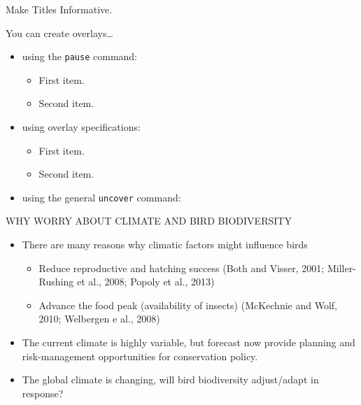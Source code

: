 \documentclass{beamer}
\begin{document}
\begin{frame}
\begin{figure}[h]
\centering
\end{figure}
\end{frame}

\begin{frame}
\begin{figure}[h]
\centering
\end{figure}
\end{frame}

\begin{frame}{Make Titles Informative.}

  You can create overlays\dots
  \begin{itemize}
  \item using the \texttt{pause} command:
    \begin{itemize}
    \item
      First item.
      \pause
    \item
      Second item.
    \end{itemize}
  \item
    using overlay specifications:
    \begin{itemize}
    \item<3->
      First item.
    \item<4->
      Second item.
    \end{itemize}
  \item
    using the general \texttt{uncover} command:
    \begin{itemize}
    \end{itemize}
  \end{itemize}
\end{frame}

\begin{frame}{WHY WORRY ABOUT CLIMATE AND BIRD BIODIVERSITY}
  \begin{itemize}
    \item There are many reasons why climatic factors might influence birds
    \begin{itemize}
      \item Reduce reproductive and hatching success (Both and Visser, 2001; Miller-Rushing et al., 2008; Popoly et al., 2013)
      \item Advance the food peak (availability of insects) (McKechnie and Wolf, 2010; Welbergen e al., 2008)
    \end{itemize}
    \item The current climate is highly variable, but forecast now provide planning and risk-management opportunities for conservation policy.
    \item The global climate is changing, will bird biodiversity adjust/adapt in response?
  \end{itemize}
\end{frame}
\end{document}
